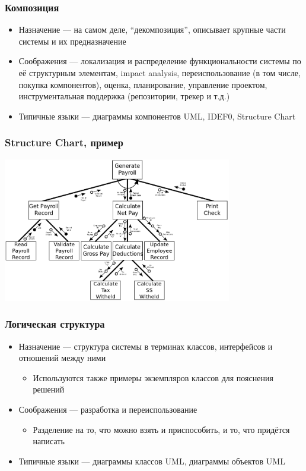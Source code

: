\documentclass[xetex,mathserif,serif]{beamer}
\begin{document}
	\begin{frame}
		\frametitle{Композиция}
		\begin{itemize}
			\item Назначение --- на самом деле, ``декомпозиция'', описывает крупные части системы и их предназначение
			\item Соображения --- локализация и распределение функциональности системы по её структурным элементам, impact analysis, переиспользование (в том числе, покупка компонентов), оценка, планирование, управление проектом, инструментальная поддержка (репозитории, трекер и т.д.)
			\item Типичные языки --- диаграммы компонентов UML, IDEF0, Structure Chart
		\end{itemize}
	\end{frame}

	\begin{frame}
		\frametitle{Structure Chart, пример}
		\begin{center}
			\includegraphics[width=0.75\textwidth]{structureChart.png}
		\end{center}
	\end{frame}

	\begin{frame}
		\frametitle{Логическая структура}
		\begin{itemize}
			\item Назначение --- структура системы в терминах классов, интерфейсов и отношений между ними
			\begin{itemize}
				\item Используются также примеры экземпляров классов для пояснения решений
			\end{itemize}
			\item Соображения --- разработка и переиспользование
			\begin{itemize}
				\item Разделение на то, что можно взять и приспособить, и то, что придётся написать
			\end{itemize}
			\item Типичные языки --- диаграммы классов UML, диаграммы объектов UML
		\end{itemize}
	\end{frame}
\end{document}
